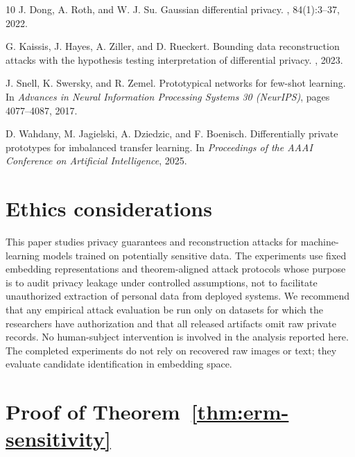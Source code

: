 \documentclass[conference,compsoc]{IEEEtran}
\begin{document}
\begin{thebibliography}{10}
J. Dong, A. Roth, and W. J. Su.
\newblock Gaussian differential privacy.
, 84(1):3--37, 2022.

G. Kaissis, J. Hayes, A. Ziller, and D. Rueckert.
\newblock Bounding data reconstruction attacks with the hypothesis testing interpretation of differential privacy.
, 2023.

J. Snell, K. Swersky, and R. Zemel.
\newblock Prototypical networks for few-shot learning.
\newblock In {\em Advances in Neural Information Processing Systems 30 (NeurIPS)}, pages 4077--4087, 2017.

D. Wahdany, M. Jagielski, A. Dziedzic, and F. Boenisch.
\newblock Differentially private prototypes for imbalanced transfer learning.
\newblock In {\em Proceedings of the AAAI Conference on Artificial Intelligence}, 2025.

\end{thebibliography}

\section*{Ethics considerations}
This paper studies privacy guarantees and reconstruction attacks for machine-learning models trained on potentially sensitive data. The experiments use fixed embedding representations and theorem-aligned attack protocols whose purpose is to audit privacy leakage under controlled assumptions, not to facilitate unauthorized extraction of personal data from deployed systems. We recommend that any empirical attack evaluation be run only on datasets for which the researchers have authorization and that all released artifacts omit raw private records. No human-subject intervention is involved in the analysis reported here. The completed experiments do not rely on recovered raw images or text; they evaluate candidate identification in embedding space. 

\appendices

\section{Proof of Theorem~\ref{thm:erm-sensitivity}}
\label{app:proof-erm-sensitivity}
\end{document}
